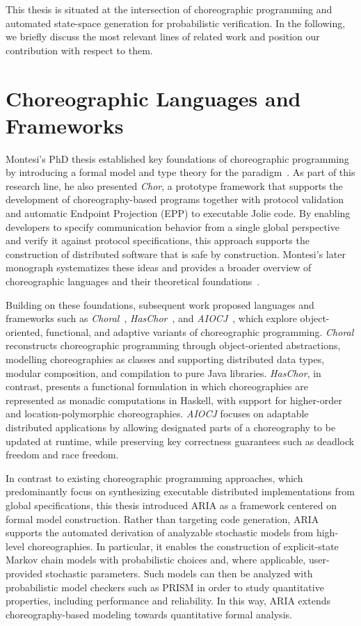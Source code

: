 This thesis is situated at the intersection of choreographic programming and automated state-space generation for probabilistic verification. In the following, we briefly discuss the most relevant lines of related work and position our contribution with respect to them.

\section{Choreographic Languages and Frameworks}
Montesi’s PhD thesis established key foundations of choreographic programming by introducing a formal model and type theory for the paradigm~\cite{Montesi2013}. As part of this research line, he also presented \textit{Chor}, a prototype framework that supports the development of choreography-based programs together with protocol validation and automatic Endpoint Projection (EPP) to executable Jolie code. By enabling developers to specify communication behavior from a single global perspective and verify it against protocol specifications, this approach supports the construction of distributed software that is safe by construction. Montesi’s later monograph systematizes these ideas and provides a broader overview of choreographic languages and their theoretical foundations~\cite{Montesi2023}. 

Building on these foundations, subsequent work proposed languages and frameworks such as \textit{Choral}~\cite{GiallorenzoMP24}, \textit{HasChor}~\cite{Shen_2023}, and \textit{AIOCJ}~\cite{lmcs:3263}, which explore object-oriented, functional, and adaptive variants of choreographic programming. \textit{Choral} reconstructs choreographic programming through object-oriented abstractions, modelling choreographies as classes and supporting distributed data types, modular composition, and compilation to pure Java libraries. \textit{HasChor}, in contrast, presents a functional formulation in which choreographies are represented as monadic computations in Haskell, with support for higher-order and location-polymorphic choreographies. \textit{AIOCJ} focuses on adaptable distributed applications by allowing designated parts of a choreography to be updated at runtime, while preserving key correctness guarantees such as deadlock freedom and race freedom.

In contrast to existing choreographic programming approaches, which predominantly focus on synthesizing executable distributed implementations from global specifications, this thesis introduced \textsc{ARIA} as a framework centered on formal model construction. Rather than targeting code generation, \textsc{ARIA} supports the automated derivation of analyzable stochastic models from high-level choreographies. In particular, it enables the construction of explicit-state Markov chain models with probabilistic choices and, where applicable, user-provided stochastic parameters. Such models can then be analyzed with probabilistic model checkers such as PRISM in order to study quantitative properties, including performance and reliability. In this way, \textsc{ARIA} extends choreography-based modeling towards quantitative formal analysis.

